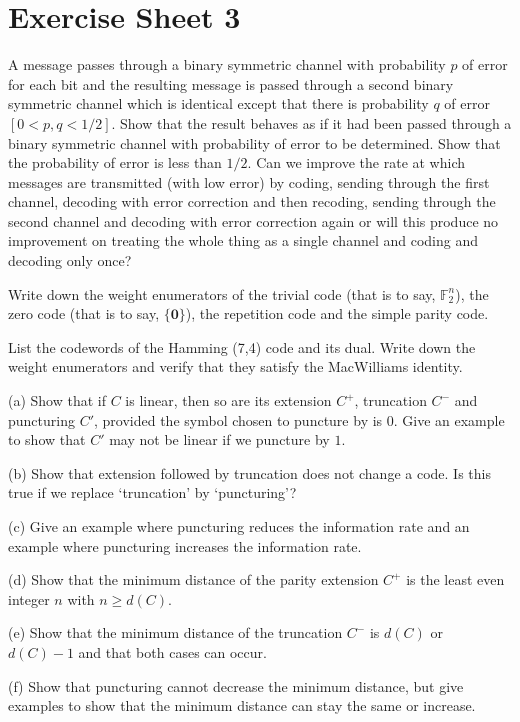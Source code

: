 \newpage
\section{Exercise Sheet 3}
\begin{question}\label{C3.1}
A message passes through a binary symmetric
channel with probability $p$ of error for each bit
and the resulting message is passed  through a 
second binary symmetric
channel which is identical except 
that there is probability $q$ of error $[0<p,q<1/2]$.
Show that the result behaves as if it had been
passed through
a binary symmetric
channel with probability of error to be determined.
Show that the probability of error is less than $1/2$.
Can we improve the rate at which messages are transmitted
(with low error) by coding,
sending through the first channel,
decoding with error correction
and then recoding, sending through the
second channel and decoding 
with error correction again or will this produce
no improvement on treating the whole thing as a single channel
and coding and decoding only once?
\end{question}
\begin{question}\label{C3.2}
Write down the weight enumerators
of the trivial code (that is to say, ${\mathbb F}_{2}^{n}$), the zero code
(that is to say, $\{{\boldsymbol 0}\}$),
the repetition code and the simple
parity code.
\end{question}
\begin{question}\label{C3.3}
List the codewords of the Hamming (7,4)
code and its dual. Write down the weight enumerators and verify
that they satisfy the MacWilliams identity.
\end{question}
\begin{question}\label{C3.4} (a) Show that if $C$ is linear,
then so are its extension $C^{+}$, truncation
$C^{-}$ and puncturing $C'$, provided the symbol
chosen to puncture by is 0. Give an example to show
that $C'$ may not be linear if we puncture by $1$.


(b) Show that extension followed by truncation does not change
a code. Is this true if we replace `truncation' by `puncturing'?

(c) Give an example where puncturing reduces the information
rate and an example where puncturing increases the information
rate.

(d) Show that the minimum distance of
the parity extension $C^{+}$ is the least even
integer $n$ with $n\geq d(C)$.

(e) Show that
the minimum distance of the truncation $C^{-}$ is $d(C)$ or $d(C)-1$
and that both cases can occur.

(f) Show that puncturing cannot decrease the minimum distance,
but give examples to show that the minimum distance can
stay the same or increase.
\end{question}
